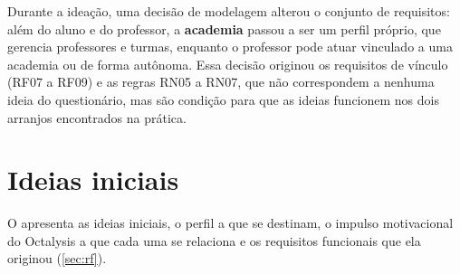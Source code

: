 Durante a ideação, uma decisão de modelagem alterou o conjunto de
requisitos: além do aluno e do professor, a \textbf{academia} passou a ser
um perfil próprio, que gerencia professores e turmas, enquanto o professor
pode atuar vinculado a uma academia ou de forma autônoma. Essa decisão
originou os requisitos de vínculo (RF07 a RF09) e as regras RN05 a RN07,
que não correspondem a nenhuma ideia do questionário, mas são condição
para que as ideias funcionem nos dois arranjos encontrados na prática.

\section{Ideias iniciais}
\label{sec:ideias}

O  apresenta as ideias iniciais, o perfil a que se
destinam, o impulso motivacional do Octalysis \cite{chou2015} a que cada
uma se relaciona e os requisitos funcionais que ela originou
(\autoref{sec:rf}).

